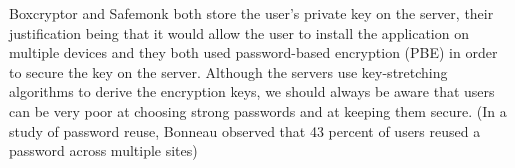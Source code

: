Boxcryptor and Safemonk both store the user's private key on the server, their justification being that it would allow the user to install the application on multiple devices and they both used password-based encryption (PBE) in order to secure the key on the server.  Although the servers use key-stretching algorithms to derive the encryption keys, we should always be aware that users can be very poor at choosing strong passwords and at keeping them secure. (In a study of password reuse, Bonneau \cite{das2014tangled} observed that 43 percent of  users reused a password across multiple sites)




